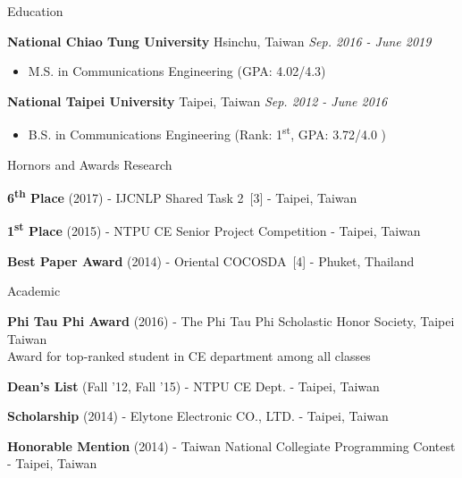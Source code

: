 \documentclass{resume} %
\newcommand{\ts}{\textsuperscript}
\begin{document}

\begin{rSection}{Education}

{\bf National Chiao Tung University} \hfill{Hsinchu, Taiwan} \hfill{\em Sep. 2016 - June 2019}
\begin{itemize} \item {M.S. in Communications Engineering (GPA: 4.02/4.3)} \end{itemize}
{\bf National Taipei University}\hspace*{2em} \hfill{Taipei, Taiwan} \hfill{\em Sep. 2012 - June 2016}
\begin{itemize} \item {B.S. in Communications Engineering (Rank: 1\ts{st}, GPA: 3.72/4.0 )} \end{itemize}
\end{rSection}


\begin{rSection}{Hornors and Awards}
    Research
    \begin{rSubsection}{}{}{}{}
    \item {\bf 6\ts{th} Place} (2017) - IJCNLP Shared Task 2~[3] - Taipei, Taiwan
    \item {\bf 1\ts{st} Place} (2015) - NTPU CE Senior Project Competition - Taipei, Taiwan
    \item {\bf Best Paper Award} (2014) - Oriental COCOSDA~[4] - Phuket, Thailand
    \end{rSubsection}
    Academic
    \begin{rSubsection}{}{}{}{}
    \item {\bf Phi Tau Phi Award} (2016) - The Phi Tau Phi Scholastic Honor Society, Taipei Taiwan \\
    Award for top-ranked student in CE department among all classes
    \item {\bf Dean's List} (Fall '12, Fall '15) - NTPU CE Dept. - Taipei, Taiwan
    \item {\bf Scholarship} (2014) - Elytone Electronic CO., LTD. - Taipei, Taiwan
    \item {\bf Honorable Mention} (2014) - Taiwan National Collegiate Programming Contest - Taipei, Taiwan
    \end{rSubsection}
    \end{rSection}
\end{document}
